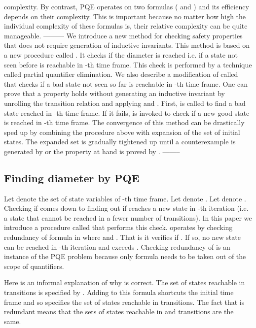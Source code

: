  complexity. By contrast, PQE operates on two formulas
( and ) and its efficiency depends on their
 complexity.  This is important because no matter how
high the individual complexity of these formulas is, their relative
complexity can be quite manageable.
---------
We introduce a new method for checking safety properties that does not
require generation of inductive invariants.  This method is based on a
new procedure called \cd. It checks if the diameter is reached i.e. if
a state not seen before is reachable in -th time frame.  This check
is performed by a technique called partial quantifier elimination. We
also describe a modification of \CD called \BS that checks if a bad
state not seen so far is reachable in -th time frame.  One can
prove that a property holds without generating an inductive invariant
by unrolling the transition relation and applying \BS and \cd. First,
\BS is called to find a bad state reached in -th time frame. If it
fails, \CD is invoked to check if a new good state is reached in
-th time frame. The convergence of this method can be drastically
sped up by combining the procedure above with expansion of the set of
initial states.  The expanded set is gradually tightened up until a
counterexample is generated by \BS or the property at hand is proved
by \cd.
--------
\subsection{Finding diameter by PQE}
Let  denote the set of state variables of -th time frame.  Let
 denote . Let  denote
. Checking if  comes down to finding out if \KS reaches a new state in
-th iteration (i.e. a state that cannot be reached in a fewer
number of transitions).  In this paper we introduce a procedure called
\CD that performs this check.  \CD operates by checking redundancy of
formula  in 
where  and . That is it verifies if
. If so, no new state can
be reached in -th iteration and  exceeds \di{\ks}.  Checking
redundancy of  is an instance of the PQE problem because only
formula  needs to be taken out of the scope of quantifiers.

Here is an informal explanation of why \CD is correct.  The set of
states reachable in  transitions is specified by
. Adding  to this
formula shortcuts the initial time frame and so
 specifies the
set of states reachable in  transitions. The fact that  is
redundant means that the sets of states reachable in  and 
transitions are the same.

